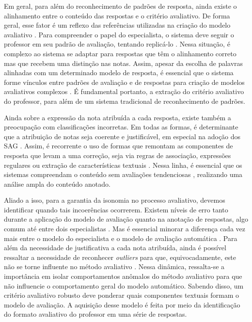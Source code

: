 Em geral, para além do reconhecimento de padrões de resposta, ainda existe o alinhamento entre o conteúdo das respostas e o critério avaliativo. De forma geral, esse fator é um reflexo das referências utilizadas na criação do modelo avaliativo \cite{krithika2015}. Para compreender o papel do especialista, o sistema deve seguir o professor em seu padrão de avaliação, tentando replicá-lo \cite{jordan2012, funayama2020}. Nessa situação, é complexo ao sistema se adaptar para respostas que têm o alinhamento correto mas que recebem uma distinção nas notas. Assim, apesar da escolha de palavras alinhadas com um determinado modelo de resposta, é essencial que o sistema forme vínculos entre padrões de avaliação e de respostas para criação de modelos avaliativos complexos \cite{higgins2014}. É fundamental portanto, a extração do critério avaliativo do professor, para além de um sistema tradicional de reconhecimento de padrões.

Ainda sobre a expressão da nota atribuída a cada resposta, existe também a preocupação com classificações incorretas. Em todas as formas, é determinante que a atribuição de notas seja coerente e justificável, em especial na adoção dos SAG \cite{funayama2020}. Assim, é recorrente o uso de formas que remontam as componentes de resposta que levam a uma correção, seja via regras de associação, expressões regulares ou extração de características textuais \cite{chakraborty2017, kumar2019}. Nessa linha, é essencial que os sistemas compreendam o conteúdo sem avaliações tendenciosas \cite{azad2020}, realizando uma análise ampla do conteúdo anotado.

Aliado a isso, para a garantia da isonomia no processo avaliativo, devemos identificar quando tais incoerências ocorrerem. Existem níveis de erro tanto durante a aplicação do modelo de avaliação quanto na anotação de respostas, algo comum até entre dois especialistas \cite{artstein2008, pado2021}. Mas é essencial minorar a diferença cada vez mais entre o modelo do especialista e o modelo de avaliação automática \cite{condor2020}. Para além da necessidade de justificativa a cada nota atribuída, ainda é possível ressaltar a necessidade de reconhecer \textit{outliers} para que, equivocadamente, este não se torne influente no método avaliativo \cite{ding2020}. Nessa dinâmica, ressalta-se a importância em isolar comportamentos anômalos do método avaliativo para que não influencie o comportamento geral do modelo automático. Sabendo disso, um critério avaliativo robusto deve ponderar quais componentes textuais formam o modelo de avaliação. A aquisição desse modelo é feita por meio da identificação do formato avaliativo do professor em uma série de respostas. 


